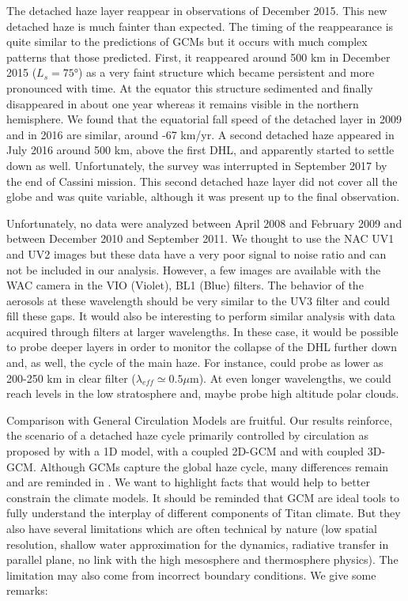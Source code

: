 The detached haze layer reappear in observations of December 2015. This new detached haze is much fainter than expected.
The timing of the reappearance is quite similar to the predictions of GCMs but it occurs with much complex patterns
that those predicted. First, it reappeared around 500 km in December 2015 ($L_s =\ang{75}$) as a very faint
structure which became persistent and more pronounced with time. At the equator this structure sedimented and finally disappeared in about one year whereas it remains visible in the northern hemisphere.
We found that the equatorial fall speed of the detached layer in 2009 and in 2016 are similar, around -67 km/yr.
A second detached haze appeared in July 2016 around 500 km, above the first DHL, and apparently started to settle down
as well. Unfortunately, the survey was interrupted in September 2017 by the end of Cassini mission. This second detached
haze layer did not cover all the globe and was quite variable, although it was present up to the final observation.

Unfortunately, no data were analyzed between April 2008 and February 2009 and between December 2010 and September 2011.
We thought to use the NAC UV1 and UV2 images but these data have a very poor signal to noise ratio and
can not be included in our analysis.
However, a few images are available with the WAC camera in the VIO (Violet), BL1 (Blue) filters.
The behavior of the aerosols at these wavelength should be very similar to the UV3 filter and could fill these gaps.
It would also be interesting to perform similar analysis with data acquired through filters at larger wavelengths.
In these case, it would be possible to probe deeper layers in order to monitor the collapse of the DHL further
down and, as well, the cycle of the main haze. For instance, \cite{Rages1983} could probe as lower as 200-250 km
in clear filter ($\lambda_{eff} \simeq 0.5 \mu$m). At even longer wavelengths, we could reach levels in the low
stratosphere and, maybe probe high altitude polar clouds.

Comparison with General Circulation Models are fruitful. Our results reinforce, the scenario of a
detached haze cycle primarily controlled by circulation as proposed by \cite{Toon1992} with a 1D model, \cite{Rannou2002}
with a coupled 2D-GCM and \cite{Lebonnois2012, Larson2015} with coupled 3D-GCM. Although GCMs capture the global
haze cycle, many differences remain and are reminded in \cite{West2018}. We want to highlight facts that
would help to better constrain the climate models. It should be reminded that GCM are ideal tools to fully understand
the interplay of different components of Titan climate. But they also have several limitations which are often
technical by nature (low spatial resolution, shallow water approximation for the dynamics, radiative transfer
in parallel plane, no link with the high mesosphere and thermosphere physics). The limitation may also come
from incorrect boundary conditions. We give some remarks:

